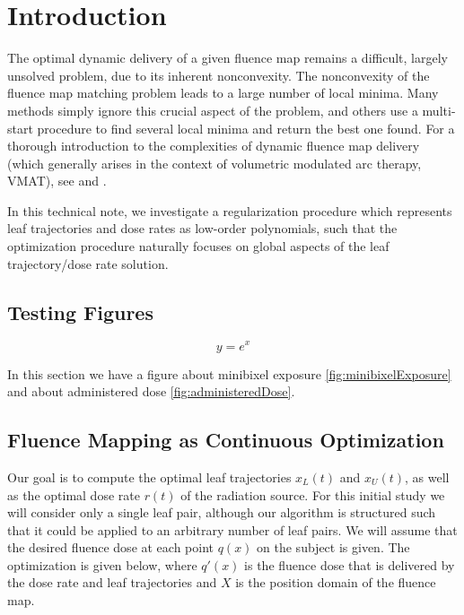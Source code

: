 \section{Introduction}
The optimal dynamic delivery of a given fluence map remains a difficult, largely unsolved problem, due to its inherent nonconvexity.
The nonconvexity of the fluence map matching problem leads to a large number of local minima.
Many methods simply ignore this crucial aspect of the problem, and others use a multi-start procedure to find several local minima and return the best one found.
For a thorough introduction to the complexities of dynamic fluence map delivery (which generally arises in the context of volumetric modulated arc therapy, VMAT),
see \cite{balvertcraft} and \cite{unkvmatreview}.

In this technical note, we investigate a regularization procedure which represents leaf trajectories and dose rates as low-order polynomials,
such that the optimization procedure naturally focuses on global aspects of the leaf trajectory/dose rate solution.

\subsection{Testing Figures}

\begin{equation}
y = e^x
\label{eqn:minibixelRefEqnTemplate}
\end{equation}





In this section we have a figure about minibixel exposure \ref{fig:minibixelExposure} and about administered dose \ref{fig:administeredDose}.

\subsection{Fluence Mapping as Continuous Optimization}

Our goal is to compute the optimal leaf trajectories $x_L(t)$ and $x_U(t)$, as well as the optimal dose rate $r(t)$ of the radiation source.
For this initial study we will consider only a single leaf pair, although our algorithm is structured such that it could be applied to an arbitrary number of leaf pairs.
We will assume that the desired fluence dose at each point $q(x)$ on the subject is given.
The optimization is given below, where $q'(x)$ is the fluence dose that is delivered by the
dose rate and leaf trajectories and $X$ is the position domain of the fluence map.

